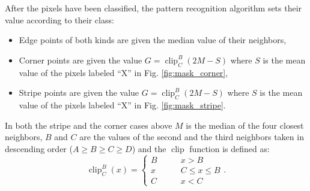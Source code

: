 \documentclass[a4paper,oneside]{article}
\DeclareMathOperator{\clip}{clip}
\begin{document}
After the pixels have been classified, the pattern recognition
algorithm sets their value according to their class:
\begin{itemize}
\item Edge points of both kinds are given the median value of their
  neighbors,
  \item Corner points are given the value $G = \clip_C^B(2M-S)$ where
    $S$ is the mean value of the pixels labeled ``X'' in
    Fig. \ref{fig:mask_corner},
    \item Stripe points are given the value $G = \clip_C^B(2M-S)$ where
    $S$ is the mean value of the pixels labeled ``X'' in
    Fig. \ref{fig:mask_stripe}.
\end{itemize}
In both the stripe and the corner cases above $M$ is the median of the
four closest neighbors, $B$ and $C$ are the values of the second and
the third neighbors taken in descending order ($A \geq B \geq C \geq
D$) and the $\clip$ function is defined as:
\begin{equation*}
  \clip_C^B(x) = \begin{cases}
    B \qquad & x > B \\
    x \qquad & C \leq x \leq B \\
    C \qquad & x < C
    \end{cases} .
\end{equation*}
\end{document}
